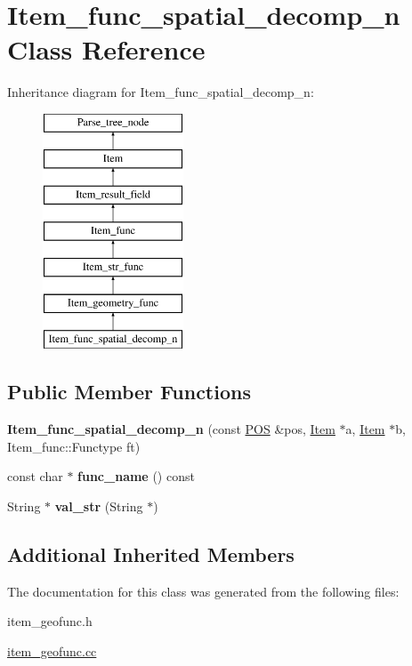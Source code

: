 \hypertarget{classItem__func__spatial__decomp__n}{}\section{Item\+\_\+func\+\_\+spatial\+\_\+decomp\+\_\+n Class Reference}
\label{classItem__func__spatial__decomp__n}
Inheritance diagram for Item\+\_\+func\+\_\+spatial\+\_\+decomp\+\_\+n\+:\begin{figure}[H]
\begin{center}
\leavevmode
\includegraphics[height=7.000000cm]{classItem__func__spatial__decomp__n}
\end{center}
\end{figure}
\subsection*{Public Member Functions}
\begin{DoxyCompactItemize}
\item 
\mbox{\label{classItem__func__spatial__decomp__n_a686c3110b0ca83f214ddf4a6352979e0}} 
{\bfseries Item\+\_\+func\+\_\+spatial\+\_\+decomp\+\_\+n} (const \mbox{\hyperlink{structYYLTYPE}{P\+OS}} \&pos, \mbox{\hyperlink{classItem}{Item}} $\ast$a, \mbox{\hyperlink{classItem}{Item}} $\ast$b, Item\+\_\+func\+::\+Functype ft)
\item 
\mbox{\label{classItem__func__spatial__decomp__n_a3fb2a2555f809a70663ce36b64581204}} 
const char $\ast$ {\bfseries func\+\_\+name} () const
\item 
\mbox{\label{classItem__func__spatial__decomp__n_ac8f93e271917ece66ef613a1467d1d83}} 
String $\ast$ {\bfseries val\+\_\+str} (String $\ast$)
\end{DoxyCompactItemize}
\subsection*{Additional Inherited Members}


The documentation for this class was generated from the following files\+:\begin{DoxyCompactItemize}
\item 
item\+\_\+geofunc.\+h\item 
\mbox{\hyperlink{item__geofunc_8cc}{item\+\_\+geofunc.\+cc}}\end{DoxyCompactItemize}
